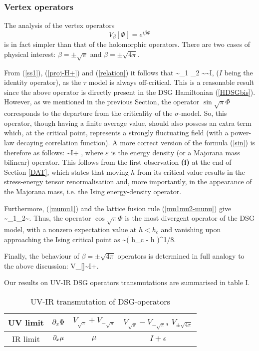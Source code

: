\subsubsection{Vertex operators}

The analysis of the vertex operators
\[
V_{\beta}[\Phi]=e^{i\beta\Phi}
\]
is in fact simpler than that of the holomorphic
operators. There are two cases of physical interest:
$\beta=\pm\sqrt{\pi}$
and $\beta=\pm \sqrt{4\pi}$.

From (\ref{ss1}), (\ref{proj-H+}) and (\ref{relation}) it follows
that
\be
\sin \sqrt{\pi} \Phi \sim  \s_1 \s_2 \sim  \tau \sim I,
\label{sin}
\ee
($I$ being the identity operator), as the $\tau$ model
is always off-critical.
 This is a reasonable result 
since the above operator is directly present in the
DSG Hamiltonian (\ref{HDSGbis}).
However, as we mentioned in the previous Section,
the operator $\sin\sqrt{\pi}\Phi$ corresponds to
the departure from the criticality of the
$\sigma$-model.
So, this operator, though having a finite average
value, should also possess an extra term 
which, at the critical point, represents a strongly
fluctuating field (with a power-law decaying correlation function). 
A more correct version of the formula (\ref{sin})
is therefore as follows:
\be 
\sin\sqrt{\pi}\Phi \sim I+ \varepsilon,
\label{sincor}
\ee
where $\varepsilon$ is the energy density 
(or a Majorana mass bilinear) operator.
This follows from the first observation {\bf (i)}
at the end of Section \ref{DAT}, which states that moving $h$ 
from its critical value 
results in the stress-energy
tensor renormalisation and, more 
importantly, in the appearance of the
Majorana mass, i.e. the Ising energy-density operator.
 

Furthermore, (\ref{mumu1}) and the 
lattice fusion rule (\ref{mu1mu2-munu}) give 
\be
\cos\sqrt{\pi}\Phi\sim\mu_1\mu_2\sim\mu.
\label{cos}
\ee
Thus, the operator $\cos\sqrt{\pi}\Phi$ is the most divergent operator
of the DSG model, with a nonzero expectation value at $h < h_c$ and
vanishing upon approaching the Ising critical point as
\be
\la \mu \ra \sim \left( h_c - h  \right)^{1/8}.
\label{av-mu-crit}
\ee

Finally, the behaviour of $\beta=\pm \sqrt{4\pi}$
operators
is determined in full analogy to the above discussion:
\be
V_{\pm\sqrt{4\pi}}[\Phi]\sim I+\epsilon.
\label{4pi}
\ee

Our results on UV-IR DSG operators transmutations are
summarised in table I. 

\begin{table}
\caption{UV-IR transmutation of DSG-operators}
\begin{center}
\begin{tabular}{|c|c|c|c|}
\hline UV limit & $\partial_x\Phi$ &
$V_{\sqrt{\pi}}+V_{-\sqrt{\pi}}$
& $V_{\sqrt{\pi}}-V_{-\sqrt{\pi}}$,
$V_{\pm\sqrt{4\pi}}$ \\ 
\hline IR limit & $\partial_x\mu$ & $\mu$ & $I+\epsilon$\\ 
\hline
\end{tabular}
\end{center}
\end{table}

